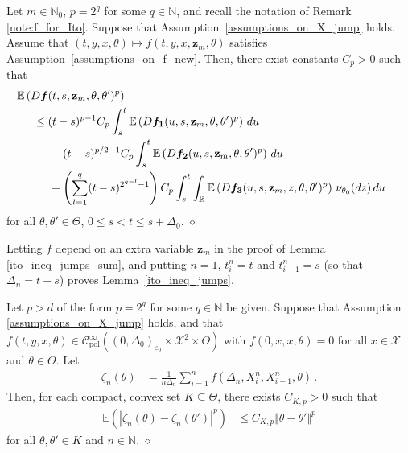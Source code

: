 \documentclass[11pt,a4paper]{article}
\newcommand{\xtl}{{X^n_{i-1}}}
\newcommand{\xtr}{X^n_i}
\newcommand{\thetan}{{\theta_0}}
\newcommand{\EE}{{\mathbb E}}
\newcommand{\RR}{{\mathbb R}}
\newcommand{\NN}{{\mathbb N}}
\newcommand{\cc}{{\mathcal{C}}}
\newcommand{\xx}{{\mathcal{X}}}
\newcommand{\dqed}{{\leavevmode \unskip \penalty9999 \hbox{} \nobreak \hfill \quad \hbox{$\diamond$}}}
\numberwithin{equation}{section}
\numberwithin{theorem}{section}
\begin{document}
%
\begin{lemma}
Let $m\in \NN_0$, $p = 2^q$ for
some $q \in \NN$, and recall the notation of Remark
\ref{note:f_for_Ito}. Suppose that
Assumption~\ref{assumptions_on_X_jump} holds. Assume that $(t,y,x, \theta) 
\mapsto f(t,y,x,\mathbf{z}_m, \theta)$ satisfies
Assumption~\ref{assumptions_on_f_new}.
Then, there exist constants
$C_p>0$  such that
\begin{align*} 
\begin{split}
&\hspace{-5mm} \EE\left( D\bm{f}(t,s,\mathbf{z}_m,
  \theta,\theta')^p\right)\\
&\leq(t-s)^{p-1}  C_p\int_s^t \EE\left( 
  D\bm{f_1}(u,s,\mathbf{z}_m, \theta,\theta')^p\right)\, du\\
&\hspace{5mm} + (t-s)^{p/2-1}  C_p\int_s^t \EE\left( 
  D\bm{f_2}(u,s,\mathbf{z}_m, \theta,\theta')^p\right)\, du \\
&\hspace{5mm} +\left( \sum_{l=1}^{q}
  (t-s)^{2^{q-l}-1}\right)  C_p\int_s^t \int_\RR
  \EE\left(D\bm{f_3}(u,s,\mathbf{z}_m,z,
  \theta,\theta')^p\right)\, \nu_\thetan(dz)\, du
\end{split}
\end{align*}
%
for all $\theta,\theta' \in \Theta$, $0\leq s < t \leq
s+\Delta_0$.  \dqed
\label{ito_ineq_jumps}
\end{lemma}
%
Letting $f$ depend on an extra
variable $\mathbf{z}_m$ in the proof of Lemma
\ref{ito_ineq_jumps_sum}, and putting $n=1$, $t_i^n = t$ and
$t_{i-1}^n = s$ (so that $\Delta_n = t-s$) proves Lemma~\ref{ito_ineq_jumps}.
%
\begin{lemma}
Let $p > d$ of the form $p=2^q$ for some $q \in \NN$ be given. Suppose that Assumption
\ref{assumptions_on_X_jump} holds, and that $f(t,y,x, \theta) \in
\cc^\infty_\text{pol}((0,\Delta_0)_{\varepsilon_0} \times \xx^2 \times
\Theta)$
%
with $f(0,x,x, \theta) =0$ for all $x\in \xx$ and
$\theta \in \Theta$. Let
\begin{align*}
\zeta_n(\theta) &= \frac{1}{n\Delta_n} \sum_{i=1}^n f(\Delta_n, \xtr, \xtl, \theta)\,.
\end{align*}
%
Then, for each compact, convex set $K\subseteq \Theta$, there exists $C_{K,p}>0$ such that 
\begin{align*}
\EE\left( |\zeta_n(\theta)-\zeta_n(\theta')|^p\right)
&\leq C_{K,p} \Vert \theta-\theta' \Vert^{p}
\end{align*}
%
for all $\theta, \theta' \in K$ and $n \in \NN$.\dqed
\label{for_uni_P}
\end{lemma}
\end{document}
